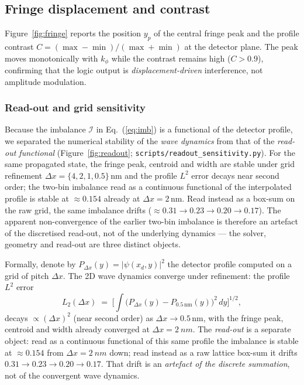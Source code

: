 \documentclass[11pt,a4paper]{article}
\newcommand{\kphi}{k_\phi}
\begin{document}
\subsection{Fringe displacement and contrast}
\label{sec:fringe}

Figure~\ref{fig:fringe} reports the position $y_p$ of the central fringe peak
and the profile contrast $C = (\max-\min)\allowbreak/(\max+\min)$ at the detector plane.
The peak moves monotonically with $\kphi$ while the contrast remains high
($C > 0.9$), confirming that the logic output is \emph{displacement-driven}
interference, not amplitude modulation.

\subsubsection{Read-out and grid sensitivity}
\label{sec:readout}

Because the imbalance $\mathcal I$ in Eq.~(\ref{eq:imb}) is a functional of the
detector profile, we separated the numerical stability of the \emph{wave
dynamics} from that of the \emph{read-out functional}
(Figure~\ref{fig:readout}; \texttt{scripts/\allowbreak readout\_sensitivity.py}). For the
same propagated state, the fringe peak, centroid and width are stable under
grid refinement $\Delta x = \{4,2,1,0.5\}$\,nm and the profile $L^2$ error
decays near second order; the two-bin imbalance read as a continuous functional
of the interpolated profile is stable at $\approx 0.154$ already at $\Delta x =
2$\,nm. Read instead as a box-sum on the raw grid, the same imbalance drifts
($\approx 0.31\rightarrow 0.23\rightarrow 0.20\rightarrow 0.17$). The apparent
non-convergence of the earlier two-bin imbalance is therefore an artefact of
the discretised read-out, not of the underlying dynamics --- the solver,
geometry and read-out are three distinct objects.

Formally, denote by $P_{\Delta x}(y)=|\psi(x_d,y)|^2$ the detector profile
computed on a grid of pitch $\Delta x$. The 2D wave dynamics converge under
refinement: the profile $L^2$ error
\begin{equation}
\label{eq:L2err}
L_2(\Delta x)\;=\;\Big[\int\!\big(P_{\Delta x}(y)-P_{0.5\,\mathrm{nm}}(y)\big)^{2}\,dy\Big]^{1/2},
\end{equation}
decays $\propto(\Delta x)^{2}$ (near second order) as
$\Delta x\to0.5\,\mathrm{nm}$, with the fringe peak, centroid and width already
converged at $\Delta x=\SI{2}{nm}$. The \emph{read-out} is a separate object:
read as a continuous functional of this same profile the imbalance is stable
at $\approx0.154$ from $\Delta x=\SI{2}{nm}$ down; read instead as a raw
lattice box-sum it drifts $0.31\to0.23\to0.20\to0.17$. That drift is an
\emph{artefact of the discrete summation}, not of the convergent wave dynamics.
\end{document}
